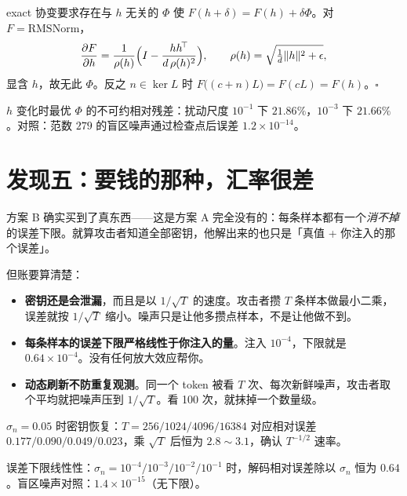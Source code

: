 \documentclass[UTF8, fontset=macnew, 11pt]{ctexart}
\newcommand{\kerL}{\ker L}
\begin{document}
\begin{mathbox}[定理 5：非线性检查点的不可交换性]
exact 协变要求存在与 $h$ 无关的 $\Phi$ 使 $F(h+\delta)=F(h)+\delta\Phi$。对 $F=\mathrm{RMSNorm}$，
$$\frac{\partial F}{\partial h}=\frac{1}{\rho(h)}\Bigl(I-\frac{hh^{\!\top}}{d\,\rho(h)^2}\Bigr),
\qquad \rho(h)=\sqrt{\tfrac1d\|h\|^2+\epsilon},$$
显含 $h$，故无此 $\Phi$。反之 $n\in\kerL$ 时 $F\bigl((c+n)L\bigr)=F(cL)=F(h)$。$\square$
\end{mathbox}

\begin{numbox}
$h$ 变化时最优 $\Phi$ 的不可约相对残差：扰动尺度 $10^{-1}$ 下 $21.86\%$，$10^{-3}$ 下 $21.66\%$。对照：范数 $279$ 的盲区噪声通过检查点后误差 $1.2\times10^{-14}$。
\end{numbox}

\section{发现五：要钱的那种，汇率很差}

\begin{plainbox}
方案 B 确实买到了真东西——这是方案 A 完全没有的：每条样本都有一个\emph{消不掉}的误差下限。就算攻击者知道全部密钥，他解出来的也只是「真值 + 你注入的那个误差」。

但账要算清楚：
\begin{itemize}
  \item \textbf{密钥还是会泄漏}，而且是以 $1/\sqrt T$ 的速度。攻击者攒 $T$ 条样本做最小二乘，误差就按 $1/\sqrt T$ 缩小。噪声只是让他多攒点样本，不是让他做不到。
  \item \textbf{每条样本的误差下限严格线性于你注入的量}。注入 $10^{-4}$，下限就是 $0.64\times10^{-4}$。没有任何放大效应帮你。
  \item \textbf{动态刷新不防重复观测}。同一个 token 被看 $T$ 次、每次新鲜噪声，攻击者取个平均就把噪声压到 $1/\sqrt T$。看 100 次，就抹掉一个数量级。
\end{itemize}
\end{plainbox}

\begin{numbox}
$\sigma_n=0.05$ 时密钥恢复：$T=256/1024/4096/16384$ 对应相对误差 $0.177/0.090/0.049/0.023$，乘 $\sqrt T$ 后恒为 $2.8\!\sim\!3.1$，确认 $T^{-1/2}$ 速率。

误差下限线性性：$\sigma_n=10^{-4}/10^{-3}/10^{-2}/10^{-1}$ 时，解码相对误差除以 $\sigma_n$ 恒为 $0.64$。盲区噪声对照：$1.4\times10^{-15}$（无下限）。
\end{numbox}
\end{document}
